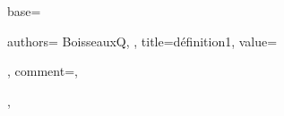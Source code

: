 {
  base={
    authors={
      BoisseauxQ,
    },
    title=définition1,
    value={
       
    },
    comment={},
  },
}
